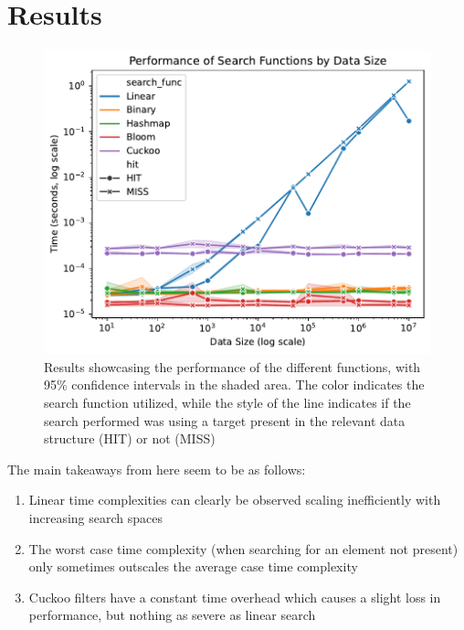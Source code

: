 \documentclass[acmsmall,screen, nonacm]{acmart}
\begin{document}
\section{Results}

\begin{figure}[H]
	\centering
	\includegraphics[width=1\textwidth]{results.pdf}
	\caption{Results showcasing the performance of the different functions, with 95\% confidence intervals in the shaded area. The color indicates the search function utilized, while the style of the line indicates if the search performed was using a target present in the relevant data structure (HIT) or not (MISS)}
	\label{fig:pdfimage}
\end{figure}

The main takeaways from here seem to be as follows:
\begin{enumerate}
	\item Linear time complexities can clearly be observed scaling inefficiently with increasing search spaces
	\item The worst case time complexity (when searching for an element not present) only sometimes outscales the average case time complexity
	\item Cuckoo filters have a constant time overhead which causes a slight loss in performance, but nothing as severe as linear search
\end{enumerate}
\end{document}
